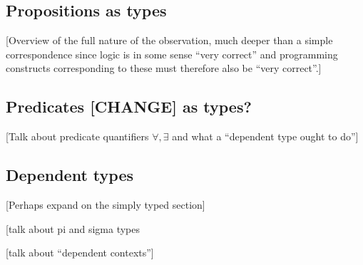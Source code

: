 \subsection{Propositions as types}

[Overview of the full nature of the observation, much deeper than a simple correspondence since logic is in some sense ``very correct'' and programming constructs corresponding to these must therefore also be ``very correct''.]

\subsection{Predicates [CHANGE] as types?}

[Talk about predicate quantifiers $\forall, \exists$ and what a ``dependent type ought to do'']


\subsection{Dependent types}




[Perhaps expand on the simply typed section]

[talk about pi and sigma types

[talk about ``dependent contexts'']


